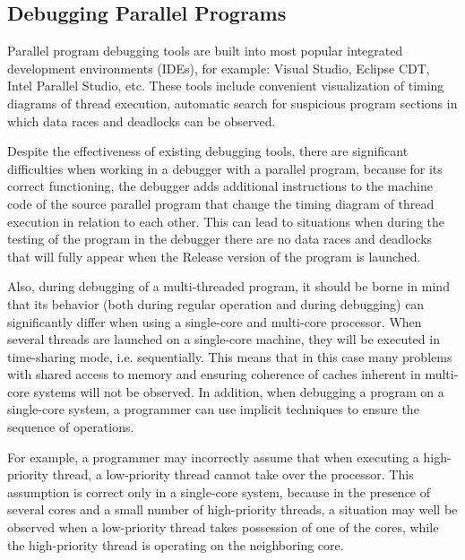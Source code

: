 { %
	\subsection{Debugging Parallel Programs}
	\par Parallel program debugging tools are built into most popular integrated development environments (IDEs), for example: Visual Studio, Eclipse CDT, Intel Parallel Studio, etc. These tools include convenient visualization of timing diagrams of thread execution, automatic search for suspicious program sections in which data races and deadlocks can be observed.
	\par Despite the effectiveness of existing debugging tools, there are significant difficulties when working in a debugger with a parallel program, because for its correct functioning, the debugger adds additional instructions to the machine code of the source parallel program that change the timing diagram of thread execution in relation to each other. This can lead to situations when during the testing of the program in the debugger there are no data races and deadlocks that will fully appear when the Release version of the program is launched.
	\par Also, during debugging of a multi-threaded program, it should be borne in mind that its behavior (both during regular operation and during debugging) can significantly differ when using a single-core and multi-core processor. When several threads are launched on a single-core machine, they will be executed in time-sharing mode, i.e. sequentially. This means that in this case many problems with shared access to memory and ensuring coherence of caches inherent in multi-core systems will not be observed. In addition, when debugging a program on a single-core system, a programmer can use implicit techniques to ensure the sequence of operations.
	\par For example, a programmer may incorrectly assume that when executing a high-priority thread, a low-priority thread cannot take over the processor. This assumption is correct only in a single-core system, because in the presence of several cores and a small number of high-priority threads, a situation may well be observed when a low-priority thread takes possession of one of the cores, while the high-priority thread is operating on the neighboring core.
	\par
}